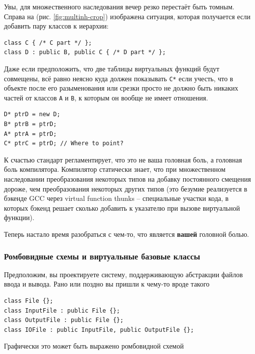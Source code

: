 \documentclass[a4paper,12pt,oneside]{article}
\begin{document}
Увы, для множественного наследования вечер резко перестаёт быть томным. Справа на (рис. \ref{fig:multinh-crop}) изображена ситуация, которая получается если добавить пару классов к иерархии:

\begin{lstlisting}
class C { /* C part */ };
class D : public B, public C { /* D part */ };
\end{lstlisting}

Даже если предположить, что две таблицы виртуальных функций будут совмещены, всё равно неясно куда должен показывать \lstinline!С*! если учесть, что в объекте после его разыменования или срезки просто не должно быть никаких частей от классов \lstinline!A! и \lstinline!B!, к которым он вообще не имеет отношения.

\begin{lstlisting}
D* ptrD = new D;
B* ptrB = ptrD;
A* ptrA = ptrD;
C* ptrC = ptrD; // Where to point?
\end{lstlisting}

К счастью стандарт регламентирует, что это не ваша головная боль, а головная боль компилятора. Компилятор статически знает, что при множественном наследовании преобразования некоторых типов на добавку постоянного смещения дороже, чем преобразования некоторых других типов (это безумие реализуется в бэкенде GCC через virtual function thunks -- специальные участки кода, в которых бэкенд решает сколько добавить к указателю при вызове виртуальной функции).

Теперь настало время разобраться с чем-то, что является \textbf{вашей} головной болью.

\subsubsection{Ромбовидные схемы и виртуальные базовые классы}\label{RombSchemas}

Предположим, вы проектируете систему, поддерживающую абстракции файлов ввода и вывода. Рано или поздно вы пришли к чему-то вроде такого

\begin{lstlisting}
class File {};
class InputFile : public File {};
class OutputFile : public File {};
class IOFile : public InputFile, public OutputFile {};
\end{lstlisting}

Графически это может быть выражено ромбовидной схемой
\end{document}
